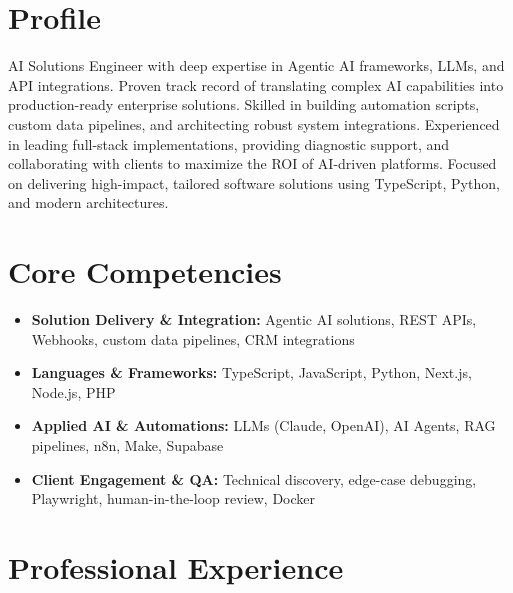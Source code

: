 \documentclass[11pt,a4paper,sans]{moderncv}
\begin{document}
\makecvtitle

\section{Profile}
AI Solutions Engineer with deep expertise in Agentic AI frameworks, LLMs, and API integrations. Proven track record of translating complex AI capabilities into production-ready enterprise solutions. Skilled in building automation scripts, custom data pipelines, and architecting robust system integrations. Experienced in leading full-stack implementations, providing diagnostic support, and collaborating with clients to maximize the ROI of AI-driven platforms. Focused on delivering high-impact, tailored software solutions using TypeScript, Python, and modern architectures.

\section{Core Competencies}
\begin{itemize}
\item \textbf{Solution Delivery \& Integration:} Agentic AI solutions, REST APIs, Webhooks, custom data pipelines, CRM integrations
\item \textbf{Languages \& Frameworks:} TypeScript, JavaScript, Python, Next.js, Node.js, PHP
\item \textbf{Applied AI \& Automations:} LLMs (Claude, OpenAI), AI Agents, RAG pipelines, n8n, Make, Supabase
\item \textbf{Client Engagement \& QA:} Technical discovery, edge-case debugging, Playwright, human-in-the-loop review, Docker
\end{itemize}

\section{Professional Experience}

\end{document}
